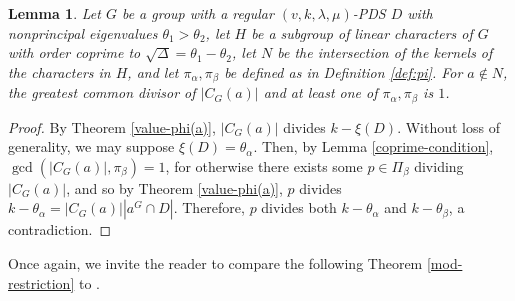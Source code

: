 \documentclass[12pt]{amsproc} %
\newtheorem{lem}[thm]{Lemma}
\theoremstyle{definition}\newtheorem{defn}[thm]{Definition}
\theoremstyle{definition}\newtheorem{rem}[thm]{Remark}
\theoremstyle{definition}\newtheorem{ex}[thm]{Example}
\begin{document}
\begin{lem}\label{coprime-centralizer}
    Let $G$ be a group with a regular $(v, k, \lambda, \mu)$-PDS $D$ with nonprincipal eigenvalues $\theta_1 > \theta_2$, let $H$ be a subgroup of linear characters of $G$ with order coprime to $\sqrt{\Delta} = \theta_1 - \theta_2$, let $N$ be the intersection of the kernels of the characters in $H$, and let $\pi_\alpha, \pi_\beta$ be defined as in Definition \ref{def:pi}.  For $a \not \in N$, the greatest common divisor of $|C_G(a)|$ and at least one of $\pi_\alpha, \pi_\beta$ is $1$.
\end{lem}
	\begin{proof}
	By Theorem \ref{value-phi(a)}, $|C_G(a)|$ divides $k-\xi(D)$. Without loss of generality, we may suppose $\xi(D) = \theta_\alpha$. Then, by Lemma \ref{coprime-condition}, $\gcd(|C_G(a)|, \pi_\beta) = 1$, for otherwise there exists some $p\in \Pi_\beta$ dividing $|C_G(a)|$, and so by Theorem \ref{value-phi(a)}, $p$ divides $k-\theta_\alpha = |C_G(a)||a^G\cap D|$. Therefore, $p$ divides both $k-\theta_\alpha$ and $k-\theta_\beta$, a contradiction.
	\end{proof}

	Once again, we invite the reader to compare the following Theorem \ref{mod-restriction} to \cite[Theorem 2.8]{ott}.
\end{document}
